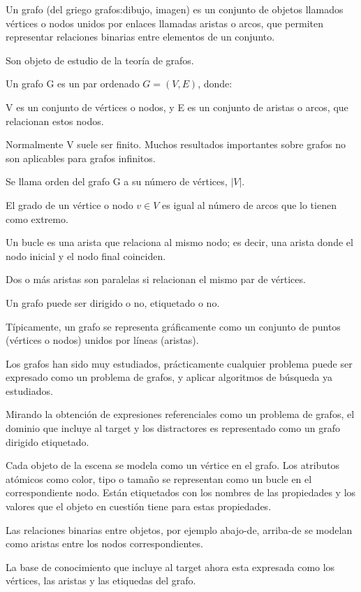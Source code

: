 Un grafo (del griego grafos:dibujo, imagen) es un conjunto de objetos llamados v\'ertices o nodos unidos por enlaces llamadas aristas o arcos, que permiten representar relaciones binarias entre elementos de un conjunto. 

Son objeto de estudio de la teor\'{i}a de grafos. 

Un grafo G es un par ordenado $G=(V,E)$, donde:

    V es un conjunto de v\'ertices o nodos, y
    E es un conjunto de aristas o arcos, que relacionan estos nodos.

Normalmente V suele ser finito. Muchos resultados importantes sobre grafos no son aplicables para grafos infinitos.

Se llama orden del grafo G a su n\'umero de v\'ertices, $|V|$.

El grado de un v\'ertice o nodo $v \in V$ es igual al n\'umero de arcos que lo tienen como extremo.

Un bucle es una arista que relaciona al mismo nodo; es decir, una arista donde el nodo inicial y el nodo final coinciden.

Dos o m\'as aristas son paralelas si relacionan el mismo par de v\'ertices.

Un grafo puede ser dirigido o no, etiquetado o no.

T\'{i}picamente, un grafo se representa gr\'aficamente como un conjunto de puntos (v\'ertices o nodos) unidos por l\'{i}neas (aristas).

Los grafos han sido muy estudiados, pr\'acticamente cualquier problema puede ser expresado como un problema de grafos, y aplicar algoritmos de b\'usqueda ya estudiados.

Mirando la obtenci\'on de expresiones referenciales como un problema de grafos, el dominio que incluye al target y los distractores es representado como un grafo dirigido etiquetado. 

Cada objeto de la escena se modela como un v\'ertice en el grafo. Los atributos at\'omicos como color, tipo o tama\~no se representan como un bucle en el correspondiente nodo. Est\'an etiquetados con los nombres de las propiedades y los valores que el objeto en cuesti\'on tiene para estas propiedades. 

Las relaciones binarias entre objetos, por ejemplo abajo-de, arriba-de se modelan como aristas entre los nodos correspondientes.

La base de conocimiento que incluye al target ahora esta expresada como los v\'ertices, las aristas y las etiquedas del grafo.


